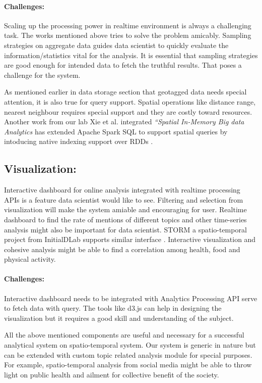 \vspace{-2mm}
\paragraph{Challenges:}
Scaling up the processing power in realtime environment is always a challenging task. The works mentioned above tries to solve the problem amicably. Sampling strategies on aggregate data guides data scientist to quickly
evaluate the information/statistics vital for the analysis. It is essential that sampling strategies are good enough for intended data to fetch the truthful results. That poses a challenge for the system.

As mentioned earlier in data storage section that geotagged data needs special attention, it is also true for query support.
Spatial operations like distance range, nearest neighbour requires special support and they are costly toward resources. Another work from our lab Xie et al. integrated {\em ``Spatial In-Memory Big data Analytics}  \cite{xie2016simba} has extended Apache Spark SQL to support spatial queries by intoducing native indexing support over RDDs \cite{zaharia2012resilient}.

\subsection{Visualization:}
Interactive dashboard for online analysis integrated with realtime processing APIs is a feature data scientist would like to see. Filtering and selection from visualization will make the system amiable and encouraging for user. Realtime dashboard to find the rate of mentions of different topics and other time-series analysis might also be important for data scientist. STORM a spatio-temporal project from InitialDLab supports similar interface \cite{christensen2015storm}. Interactive visualization and cohesive analysis might be able to find a correlation among health, food and physical activity.

\vspace{-2mm}
\paragraph{Challenges:}
Interactive dashboard needs to be integrated with Analytics Processing API serve to fetch data with query. The tools like d3.js can help in designing the visualization but it requires a good skill and understanding of the subject.


All the above mentioned components are useful and necessary for a successful analytical system on spatio-temporal system. Our system is generic in nature but can be extended with custom topic related analysis module for special purposes. For example, spatio-temporal analysis from social media might be able to throw light on public health and ailment for collective benefit of the society.


